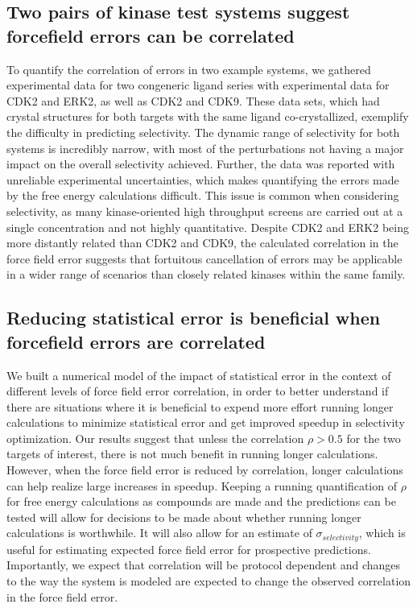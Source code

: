 \documentclass[phd,tocprelim]{cornell}
\begin{document}
\subsection{Two pairs of kinase test systems suggest forcefield errors can be correlated}
To quantify the correlation of errors in two example systems, we gathered experimental data for two congeneric ligand series with experimental data for CDK2 and ERK2, as well as CDK2 and CDK9. These data sets, which had crystal structures for both targets with the same ligand co-crystallized, exemplify the difficulty in predicting selectivity. 
The dynamic range of selectivity for both systems is incredibly narrow, with most of the perturbations not having a major impact on the overall selectivity achieved. 
Further, the data was reported with unreliable experimental uncertainties, which makes quantifying the errors made by the free energy calculations difficult. 
This issue is common when considering selectivity, as many kinase-oriented high throughput screens are carried out at a single concentration and not highly quantitative. 
Despite CDK2 and ERK2 being more distantly related than CDK2 and CDK9, the calculated correlation in the force field error suggests that fortuitous cancellation of errors may be applicable in a wider range of scenarios than closely related kinases within the same family. 

\subsection{Reducing statistical error is beneficial when forcefield errors are correlated}

We built a numerical model of the impact of statistical error in the context of different levels of force field error correlation, in order to better understand if there are situations where it is beneficial to expend more effort running longer calculations to minimize statistical error and get improved speedup in selectivity optimization. 
Our results suggest that unless the correlation $\rho > 0.5$ for the two targets of interest, there is not much benefit in running longer calculations. 
However, when the force field error is reduced by correlation, longer calculations can help realize large increases in speedup. Keeping a running quantification of $\rho$ for free energy calculations as compounds are made and the predictions can be tested will allow for decisions to be made about whether running longer calculations is worthwhile. It will also allow for an estimate of $\sigma_{selectivity}$, which is useful for estimating expected force field error for prospective predictions. Importantly, we expect that correlation will be protocol dependent and changes to the way the system is modeled are expected to change the observed correlation in the force field error. 
\end{document}

